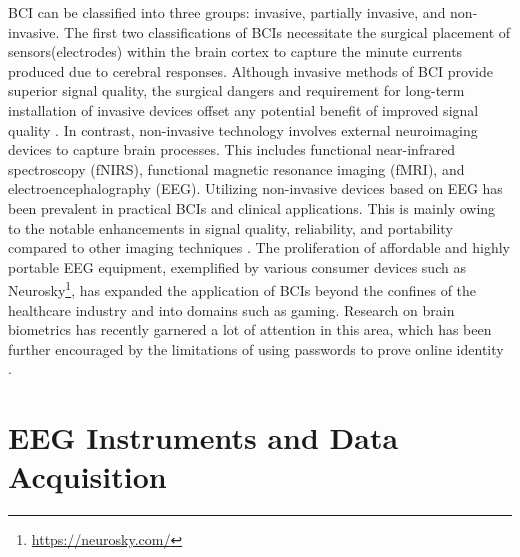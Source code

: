 BCI can be classified into three groups: invasive, partially invasive, and non-invasive. The first two classifications of BCIs necessitate the surgical placement of sensors(electrodes) within the brain cortex to capture the minute currents produced due to cerebral responses. Although invasive methods of BCI provide superior signal quality, the surgical dangers and requirement for long-term installation of invasive devices offset any potential benefit of improved signal quality \cite{velasco2019bci}. 
In contrast, non-invasive technology involves external neuroimaging devices to capture brain processes. This includes functional near-infrared spectroscopy (fNIRS), functional magnetic resonance imaging (fMRI), and electroencephalography (EEG). Utilizing non-invasive devices based on EEG has been prevalent in practical BCIs and clinical applications. This is mainly owing to the notable enhancements in signal quality, reliability, and portability compared to other imaging techniques \cite{BCI_applications}. The proliferation of affordable and highly portable EEG equipment, exemplified by various consumer devices such as Neurosky\footnote{\url{https://neurosky.com/}}, has expanded the application of BCIs beyond the confines of the healthcare industry and into domains such as gaming. Research on brain biometrics has recently garnered a lot of attention in this area, which has been further encouraged by the limitations of using passwords to prove online identity \cite{arias2021inexpensive}.  


\section{EEG Instruments and Data Acquisition}
\label{sec:Background:EEG Instruments and Data Acquisition}

